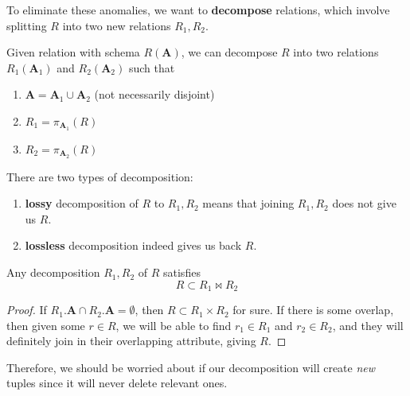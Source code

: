   To eliminate these anomalies, we want to \textbf{decompose} relations, which involve splitting $R$ into two new relations $R_1, R_2$. 

  \begin{definition}[Decomposition]
    Given relation with schema $R(\mathbf{A})$, we can decompose $R$ into two relations $R_1 (\mathbf{A}_1)$ and $R_2 (\mathbf{A}_2)$ such that 
    \begin{enumerate}
      \item $\mathbf{A} = \mathbf{A}_1 \cup \mathbf{A}_2$ (not necessarily disjoint)
      \item $R_1 = \pi_{\mathbf{A}_1} (R)$
      \item $R_2 = \pi_{\mathbf{A}_2} (R)$
    \end{enumerate}
    There are two types of decomposition: 
    \begin{enumerate}
      \item \textbf{lossy} decomposition of $R$ to $R_1, R_2$ means that joining $R_1, R_2$ does not give us $R$. 
      \item \textbf{lossless} decomposition indeed gives us back $R$. 
    \end{enumerate}
  \end{definition}

  \begin{theorem}[Decomposition]
    Any decomposition $R_1, R_2$ of $R$ satisfies 
    \begin{equation}
      R \subset R_1 \bowtie R_2
    \end{equation}
  \end{theorem} 
  \begin{proof}
    If $R_1.\mathbf{A} \cap R_2.\mathbf{A} = \emptyset$, then $R \subset R_1 \times R_2$ for sure. If there is some overlap, then given some $r \in R$, we will be able to find $r_1 \in R_1$ and $r_2 \in R_2$, and they will definitely join in their overlapping attribute, giving $R$. 
  \end{proof}

  Therefore, we should be worried about if our decomposition will create \textit{new} tuples since it will never delete relevant ones.

